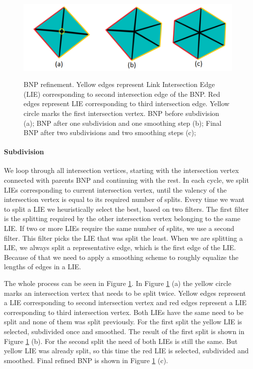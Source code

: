 \begin{figure}[h]
    \centering
    \includegraphics[width=\textwidth]{images/refinement_ilu.png}
    \label{fig:refinement_ilu}
    \caption[BNP refinement]{BNP refinement. Yellow edges represent Link Intersection Edge (LIE) corresponding to second intersection edge of the BNP. Red edges represent LIE corresponding to third intersection edge. Yellow circle marks the first intersection vertex. BNP before subdivision (a); BNP after one subdivision and one smoothing step (b); Final BNP after two subdivisions and two smoothing steps (c);}
\end{figure}

\paragraph{Subdivision}
We loop through all intersection vertices, starting with the intersection vertex connected with parents BNP and continuing with the rest. In each cycle, we split LIEs corresponding to current intersection vertex, until the valency of the intersection vertex is equal to its required number of splits. Every time we want to split a LIE we heuristically select the best, based on two filters. The first filter is the splitting required by the other intersection vertex belonging to the same LIE. If two or more LIEs require the same number of splits, we use a second filter. This filter picks the LIE that was split the least. When we are splitting a LIE, we always split a representative edge, which is the first edge of the LIE. Because of that we need to apply a smoothing scheme to roughly equalize the lengths of edges in a LIE. 

The whole process can be seen in Figure \ref{fig:refinement_ilu}. In Figure \ref{fig:refinement_ilu} (a) the yellow circle marks an intersection vertex that needs to be split twice. Yellow edges represent a LIE corresponding to second intersection vertex and red edges represent a LIE corresponding to third intersection vertex. Both LIEs have the same need to be split and none of them was split previously. For the first split the yellow LIE is selected, subdivided once and smoothed. The result of the first split is shown in Figure \ref{fig:refinement_ilu} (b). For the second split the need of both LIEs is still the same. But yellow LIE was already split, so this time the red LIE is selected, subdivided and smoothed. Final refined BNP is shown in Figure \ref{fig:refinement_ilu} (c).

